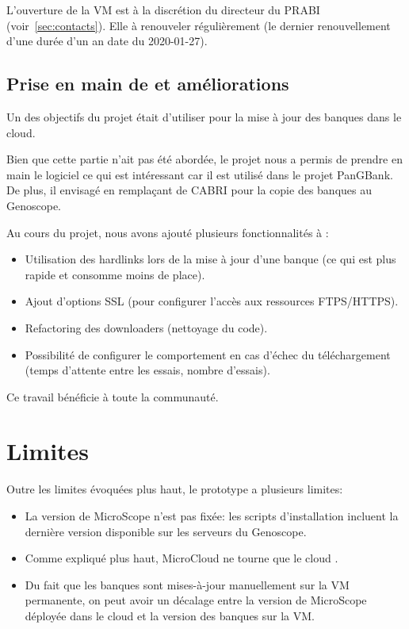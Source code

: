 \begin{warningbox}
    L'ouverture de la VM est à la discrétion du directeur du PRABI (voir~\autoref{sec:contacts}).
    Elle à renouveler régulièrement (le dernier renouvellement d'une durée d'un an date du 2020-01-27).
\end{warningbox}

\subsection{Prise en main de  et améliorations}\label{subsec:biomaj}

Un des objectifs du projet était d'utiliser  pour la mise à jour des banques dans le cloud.

Bien que cette partie n'ait pas été abordée, le projet nous a permis de prendre en main le logiciel
ce qui est intéressant car il est utilisé dans le projet PanGBank.
De plus, il envisagé en remplaçant de CABRI pour la copie des banques au Genoscope.

Au cours du projet, nous avons ajouté plusieurs fonctionnalités à :
\begin{itemize}
    \item Utilisation des hardlinks lors de la mise à jour d'une banque (ce qui est plus rapide et consomme moins de place).
    \item Ajout d'options SSL (pour configurer l'accès aux ressources FTPS/HTTPS).
    \item Refactoring des downloaders (nettoyage du code).
    \item Possibilité de configurer le comportement en cas d'échec du téléchargement (temps d'attente entre les essais, nombre d'essais).
\end{itemize}

Ce travail bénéficie à toute la communauté.

\section{Limites}

Outre les limites évoquées plus haut, le prototype a plusieurs limites:
\begin{itemize}
    \item La version de MicroScope n'est pas fixée: les scripts d'installation incluent la dernière version disponible sur les serveurs du Genoscope.
    \item Comme expliqué plus haut, MicroCloud ne tourne que le cloud .
    \item Du fait que les banques sont mises-à-jour manuellement sur la VM permanente, on peut avoir un décalage entre la version de MicroScope déployée dans le cloud
          et la version des banques sur la VM.
\end{itemize}

